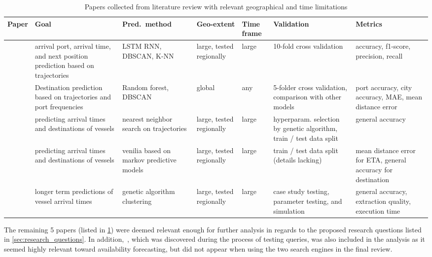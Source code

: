 \begin{table}[htbp]
    \centering
    \begin{tabular}{p{0.6in} p{0.8in} p{0.75in} p{0.6in} p{0.5in} p{0.8in} p{0.8in}}
    \hline
    \bfseries{Paper} & \bfseries{Goal} & \bfseries{Pred.\ method} & \bfseries{Geo-extent} & \bfseries{Time frame} & \bfseries{Validation} & \bfseries{Metrics} \\ \hline
        \cite{Karatas2020TrajectoryData} & arrival port, arrival time, and next position prediction based on trajectories & LSTM RNN, DBSCAN, K-NN & large, tested regionally & large & 10-fold cross validation & accuracy, f1-score, precision, recall \\ \hline
        \cite{Zhang2020AISApproach} & Destination prediction based on trajectories and port frequencies & Random forest, DBSCAN & global & any & 5-folder cross validation, comparison with other models & port accuracy, city accuracy, MAE, mean distance error \\ \hline
        \cite{Rosca2018GrandRoutes} & predicting arrival times and destinations of vessels & nearest neighbor search on trajectories & large, tested regionally & large & hyperparam. selection by genetic algorithm, train / test data split & general accuracy \\ \hline
        \cite{Bachar2018GrandDestination} & predicting arrival times and destinations of vessels & venilia based on markov predictive models & large, tested regionally & large & train / test data split (details lacking) & mean distance error for ETA, general accuracy for destination \\ \hline
        \cite{Dobrkovic2018MaritimeData} & longer term predictions of vessel arrival times & genetic algorithm clustering & large, tested regionally & large & case study testing, parameter testing, and simulation & general accuracy, extraction quality, execution time \\ \hline
    \end{tabular}
\caption{Papers collected from literature review with relevant geographical and time limitations}\label{tab:most_relevant_papers}
\end{table}

The remaining \textbf{}5 papers (listed in \cref{tab:most_relevant_papers}) were deemed relevant enough for further analysis in regards to the proposed research questions listed in \cref{sec:research_questions}. In addition,~\cite{lechtenberg2019}, which was discovered during the process of testing queries, was also included in the analysis as it seemed highly relevant toward availability forecasting, but did not appear when using the two search engines in the final review.

